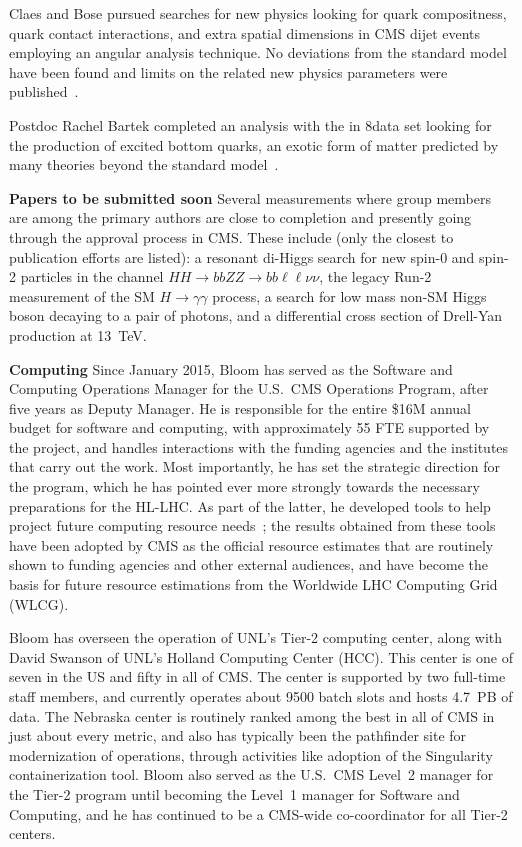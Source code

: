 Claes and Bose pursued searches for new physics looking for quark compositness, quark contact interactions, and extra spatial dimensions in CMS dijet events employing an angular analysis technique. No deviations from the standard model have been found and limits on the related new physics parameters were published~\cite{bib:quark-compositness-etc}.

Postdoc Rachel Bartek completed an analysis with the in 8\TeV data set looking for the production of excited bottom quarks, an exotic form of matter predicted by many theories beyond the standard model~\cite{bib:bstar}. 

{\bf Papers to be submitted soon} Several measurements where group members are among the primary authors are close to completion and presently going through the approval process in CMS. These include (only the closest to publication efforts are listed): a resonant di-Higgs search for new spin-0 and spin-2 particles in the channel $HH\to bbZZ\to bb\ell\ell\nu\nu$, the legacy Run-2 measurement of the SM $H\to\gamma\gamma$ process, a search for low mass non-SM Higgs boson decaying to a pair of photons, and a differential cross section of Drell-Yan production at 13~TeV. 

{\bf Computing} Since January 2015, Bloom has served as the Software and
Computing Operations Manager for the U.S.~CMS Operations Program, after
five years as Deputy Manager.  He is responsible for the entire \$16M
annual budget for software and computing, with approximately 55 FTE
supported by the project, and handles interactions with the funding
agencies and the institutes that carry out the work.  Most importantly, he
has set the strategic direction for the program, which he has pointed ever
more strongly towards the necessary preparations for the HL-LHC.  As part
of the latter, he developed tools to help project future computing resource
needs~\cite{bib:resource-modeling}; the results obtained from these tools
have been adopted by CMS as the official resource estimates that are
routinely shown to funding agencies and other external audiences, and have
become the basis for future resource estimations from the Worldwide LHC
Computing Grid (WLCG).

Bloom has overseen the operation of UNL's Tier-2 computing center, along
with David Swanson of UNL's Holland Computing Center (HCC). This center is
one of seven in the US and fifty in all of CMS. The center is supported by
two full-time staff members, and currently operates about 9500 batch slots
and hosts 4.7~PB of data. The Nebraska center is routinely ranked among the
best in all of CMS in just about every metric, and also has typically been
the pathfinder site for modernization of operations, through activities
like adoption of the Singularity containerization tool. Bloom also served
as the U.S.~CMS Level~2 manager for the Tier-2 program until becoming the
Level~1 manager for Software and Computing, and he has continued to be a
CMS-wide co-coordinator for all Tier-2 centers.


